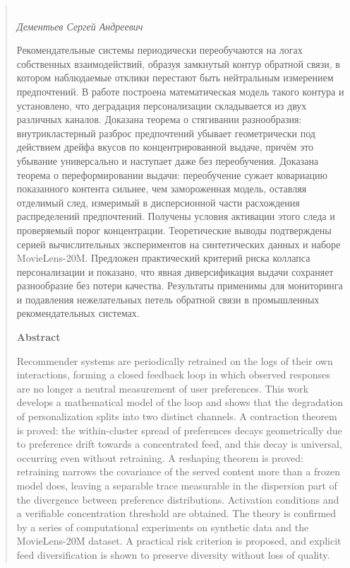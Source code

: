 \begin{abstract}

    \begin{center}
        \large{} \\
        \large\textit{Дементьев Сергей Андреевич} \\[0.6cm]
    \end{center}

    Рекомендательные системы периодически переобучаются на логах собственных
    взаимодействий, образуя замкнутый контур обратной связи, в котором
    наблюдаемые отклики перестают быть нейтральным измерением предпочтений. В
    работе построена математическая модель такого контура и установлено, что
    деградация персонализации складывается из двух различных каналов. Доказана
    теорема о стягивании разнообразия: внутрикластерный разброс предпочтений
    убывает геометрически под действием дрейфа вкусов по концентрированной
    выдаче, причём это убывание универсально и наступает даже без переобучения.
    Доказана теорема о переформировании выдачи: переобучение сужает ковариацию
    показанного контента сильнее, чем замороженная модель, оставляя отделимый
    след, измеримый в дисперсионной части расхождения распределений
    предпочтений. Получены условия активации этого следа и проверяемый порог
    концентрации. Теоретические выводы подтверждены серией вычислительных
    экспериментов на синтетических данных и наборе MovieLens-20M. Предложен
    практический критерий риска коллапса персонализации и показано, что явная
    диверсификация выдачи сохраняет разнообразие без потери качества. Результаты
    применимы для мониторинга и подавления нежелательных петель обратной связи в
    промышленных рекомендательных системах.

    \vfill

    \begin{center}
        \textbf{Abstract} \\[0.6cm]
    \end{center}

    Recommender systems are periodically retrained on the logs of their own
    interactions, forming a closed feedback loop in which observed responses are
    no longer a neutral measurement of user preferences. This work develops a
    mathematical model of the loop and shows that the degradation of
    personalization splits into two distinct channels. A contraction theorem is
    proved: the within-cluster spread of preferences decays geometrically due to
    preference drift towards a concentrated feed, and this decay is universal,
    occurring even without retraining. A reshaping theorem is proved: retraining
    narrows the covariance of the served content more than a frozen model does,
    leaving a separable trace measurable in the dispersion part of the divergence
    between preference distributions. Activation conditions and a verifiable
    concentration threshold are obtained. The theory is confirmed by a series of
    computational experiments on synthetic data and the MovieLens-20M dataset. A
    practical risk criterion is proposed, and explicit feed diversification is
    shown to preserve diversity without loss of quality.

\end{abstract}
